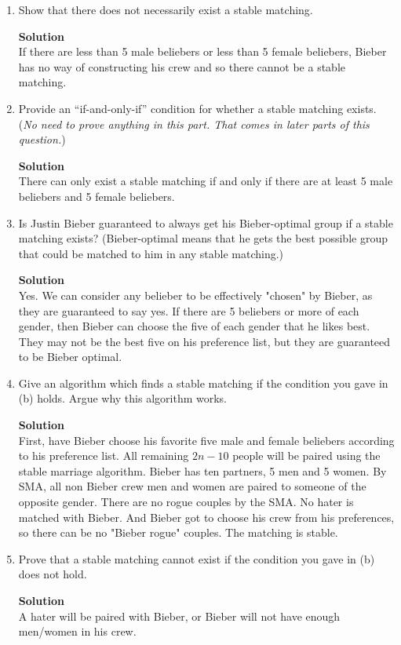 \documentclass[11pt]{article}
\newenvironment{Parts}{\begin{enumerate}[label=(\alph*)]}{\end{enumerate}}
\newcommand*{\Part}{\item}
\begin{document}
\begin{Parts}
\Part { Show that there does not necessarily exist a stable matching.}

\begin{mdframed} \textbf{Solution} \\
If there are less than 5 male beliebers or less than 5 female beliebers, Bieber has no way of constructing his crew and so there cannot be a stable matching. 
\end{mdframed}

\Part { Provide an ``if-and-only-if'' condition for whether a
    stable matching exists. } ({\em No need to prove anything in this
  part. That comes in later parts of this question.})

\begin{mdframed} \textbf{Solution} \\
There can only exist a stable matching if and only if there are at least 5 male beliebers and 5 female beliebers.
\end{mdframed}

\Part { Is Justin Bieber guaranteed to always get his
    Bieber-optimal group if a stable matching exists?} (Bieber-optimal
  means that he gets the best possible group that could be matched to
  him in any stable matching.)

\begin{mdframed} \textbf{Solution} \\
Yes. We can consider any belieber to be effectively "chosen" by Bieber, as they are guaranteed to say yes. If there are 5 beliebers or more of each gender, then Bieber can choose the five of each gender that he likes best. They may not be the best five on his preference list, but they are guaranteed to be Bieber optimal.
\end{mdframed}

\Part { Give an algorithm which finds a stable matching if the condition
  you gave in (b) holds. Argue why this algorithm works.}

\begin{mdframed} \textbf{Solution} \\
First, have Bieber choose his favorite five male and female beliebers according to his preference list. All remaining $2n-10$ people will be paired using the stable marriage algorithm. Bieber has ten partners, 5 men and 5 women. By SMA, all non Bieber crew men and women are paired to someone of the opposite gender. There are no rogue couples by the SMA. No hater is matched with Bieber. And Bieber got to choose his crew from his preferences, so there can be no "Bieber rogue" couples. The matching is stable.
\end{mdframed}

\Part { Prove that a stable matching cannot exist if
    the condition you gave in (b) does not hold.}

\begin{mdframed} \textbf{Solution} \\
A hater will be paired with Bieber, or Bieber will not have enough men/women in his crew.
\end{mdframed}

\end{Parts}
\end{document}
